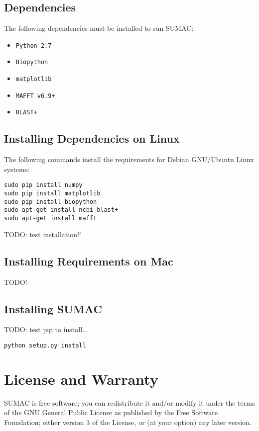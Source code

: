 \documentclass[10pt]{report}
\begin{document}
\subsection{Dependencies}

The following dependencies must be installed to run SUMAC:

\begin{itemize}
\item \texttt{Python 2.7}
\item \texttt{Biopython}
\item \texttt{matplotlib}
\item \texttt{MAFFT v6.9+}
\item \texttt{BLAST+}
\end{itemize}

\subsection{Installing Dependencies on Linux}

The following commands install the requirements for Debian GNU/Ubuntu Linux systems:

\begin{verbatim}
sudo pip install numpy
sudo pip install matplotlib
sudo pip install biopython
sudo apt-get install ncbi-blast+
sudo apt-get install mafft
\end{verbatim}

TODO: test installation!!

\subsection{Installing Requirements on Mac}

TODO!

\subsection{Installing SUMAC}

TODO: test pip to install...

\begin{verbatim}
python setup.py install
\end{verbatim}

\section{License and Warranty}
SUMAC is free software; you can redistribute it and/or modify it under the terms of the GNU General Public License as published by the Free Software Foundation; either version 3 of the License, or (at your option) any later version.
\end{document}
